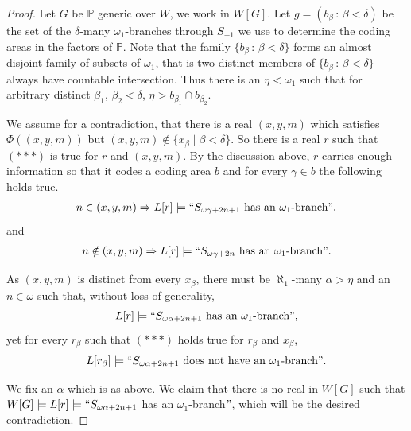 \documentclass[10pt,a4paper]{amsart}
\newcommand{\forceP}{\mathbb{P}}
\begin{document}
\begin{proof}
Let $G$ be $\forceP$ generic over $W$, we work in $W[G]$. Let $g= (b_{\beta} \, : \, {\beta} < \delta)$ be the set of the $\delta$-many $\omega_1$-branches through $S_{-1}$ we use to determine the coding areas in  the factors of $\forceP$.  Note that the family $\{b_{\beta} \,: \, \beta < \delta \}$ forms an almost disjoint family of subsets of $\omega_1$, that is two distinct members of  $\{b_{\beta} \,: \, \beta < \delta \}$ always have countable intersection. Thus there is an $\eta < \omega_1$ such that for arbitrary distinct $\beta_1$, $\beta_2 < \delta$,  $\eta> b_{\beta_1}\cap b_{\beta_2}$.  


We assume for a contradiction, that there is a real $(x,y,m)$ which satisfies $\Phi ((x,y,m))$ but $(x,y,m) \notin \{x_{\beta} \mid \beta < \delta \}$.
So there is a real $r$ such that $( {\ast} {\ast} {\ast})$ is true for $r$ and $(x,y,m)$. By the discussion above, $r$ carries enough information so that it codes a coding area $b$ and for every $\gamma \in b$ the following holds true.
\begin{align*}
n \in (x,y,m) \Rightarrow L[r] \models  ``S_{\omega \gamma + 2n+1} \text{ has an $\omega_1$-branch}".
\end{align*}
and
\begin{align*}
n \notin (x,y,m) \Rightarrow L[r] \models ``S_{\omega \gamma + 2n} \text{ has an $\omega_1$-branch}".
\end{align*}


As $(x,y,m)$ is distinct from every $x_{\beta}$, there must be $\aleph_1$-many $\alpha > \eta$ and an $n \in \omega$ such that, without loss of generality,
\[L[r] \models ``S_{\omega \alpha + 2n+1} \text{ has an $\omega_1$-branch}",\]
yet for every $r_{\beta}$ such that $({\ast} {\ast} {\ast} )$ holds true for $r_{\beta} $ and $x_{\beta}$,
\[L[r_{\beta}] \models  ``S_{\omega \alpha + 2n+1} \text{ does not have an $\omega_1$-branch}".\]

We fix an $\alpha$ which is as above. We claim  that there is no real in $W[G]$ such that $W[G] \models L[r] \models ``S_{\omega \alpha + 2n+1}$ has an $\omega_1$-branch$"$, which will be the desired contradiction.



\end{proof}
\end{document}
